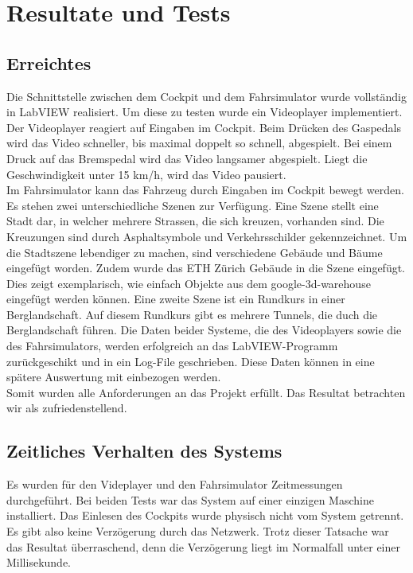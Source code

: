 \section{Resultate und Tests}
\subsection{Erreichtes}
Die Schnittstelle zwischen dem Cockpit und dem Fahrsimulator wurde vollständig in LabVIEW realisiert. Um diese zu testen wurde ein Videoplayer implementiert. Der Videoplayer reagiert auf Eingaben im Cockpit. Beim Drücken des Gaspedals wird das Video schneller, bis maximal doppelt so schnell, abgespielt. Bei einem Druck auf das Bremspedal wird das Video langsamer abgespielt. Liegt die Geschwindigkeit unter 15 km/h, wird das Video pausiert.\\
Im Fahrsimulator kann das Fahrzeug durch Eingaben im Cockpit bewegt werden. Es stehen zwei unterschiedliche Szenen zur Verfügung. Eine Szene stellt eine Stadt dar, in welcher mehrere Strassen, die sich kreuzen, vorhanden sind. Die Kreuzungen sind durch Asphaltsymbole und Verkehrsschilder gekennzeichnet. Um die Stadtszene lebendiger zu machen, sind verschiedene Gebäude und Bäume eingefügt worden. Zudem wurde das ETH Zürich Gebäude in die Szene eingefügt. Dies zeigt exemplarisch, wie einfach Objekte aus dem \gls{google-3d-warehouse} eingefügt werden können. Eine zweite Szene ist ein Rundkurs in einer Berglandschaft. Auf diesem Rundkurs gibt es mehrere Tunnels, die duch die Berglandschaft führen.
Die Daten beider Systeme, die des Videoplayers sowie die des Fahrsimulators, werden erfolgreich an das LabVIEW-Programm zurückgeschikt und in ein Log-File geschrieben. Diese Daten können in eine spätere Auswertung mit einbezogen werden.\\
Somit wurden alle Anforderungen an das Projekt erfüllt. Das Resultat betrachten wir als zufriedenstellend. 
\subsection{Zeitliches Verhalten des Systems}
Es wurden für den Videplayer und den Fahrsimulator Zeitmessungen durchgeführt. Bei beiden Tests war das System auf einer einzigen Maschine installiert. Das Einlesen des Cockpits wurde physisch nicht vom System getrennt. Es gibt also keine Verzögerung durch das Netzwerk. Trotz dieser Tatsache war das Resultat überraschend, denn die Verzögerung liegt im Normalfall unter einer Millisekunde.

